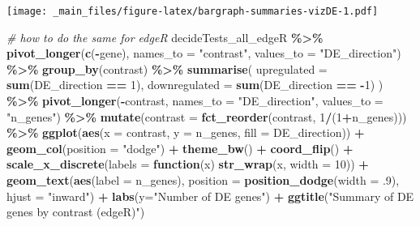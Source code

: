 \documentclass[
]{book}
\newenvironment{Shaded}{\begin{snugshade}}{\end{snugshade}}
\newcommand{\AttributeTok}[1]{\textcolor[rgb]{0.13,0.29,0.53}{#1}}
\newcommand{\CommentTok}[1]{\textcolor[rgb]{0.56,0.35,0.01}{\textit{#1}}}
\newcommand{\ControlFlowTok}[1]{\textcolor[rgb]{0.13,0.29,0.53}{\textbf{#1}}}
\newcommand{\DecValTok}[1]{\textcolor[rgb]{0.00,0.00,0.81}{#1}}
\newcommand{\FunctionTok}[1]{\textcolor[rgb]{0.13,0.29,0.53}{\textbf{#1}}}
\newcommand{\NormalTok}[1]{#1}
\newcommand{\SpecialCharTok}[1]{\textcolor[rgb]{0.81,0.36,0.00}{\textbf{#1}}}
\newcommand{\StringTok}[1]{\textcolor[rgb]{0.31,0.60,0.02}{#1}}
\begin{document}
\texttt{[image: \_main\_files/figure-latex/bargraph-summaries-vizDE-1.pdf]}

\begin{Shaded}
\begin{Highlighting}[]
\CommentTok{\# how to do the same for edgeR}
\NormalTok{decideTests\_all\_edgeR }\SpecialCharTok{\%\textgreater{}\%}
  \FunctionTok{pivot\_longer}\NormalTok{(}\FunctionTok{c}\NormalTok{(}\SpecialCharTok{{-}}\NormalTok{gene), }\AttributeTok{names\_to =} \StringTok{"contrast"}\NormalTok{, }\AttributeTok{values\_to =} \StringTok{"DE\_direction"}\NormalTok{) }\SpecialCharTok{\%\textgreater{}\%}
  \FunctionTok{group\_by}\NormalTok{(contrast) }\SpecialCharTok{\%\textgreater{}\%}
  \FunctionTok{summarise}\NormalTok{(}
    \AttributeTok{upregulated =} \FunctionTok{sum}\NormalTok{(DE\_direction }\SpecialCharTok{==} \DecValTok{1}\NormalTok{),}
    \AttributeTok{downregulated =} \FunctionTok{sum}\NormalTok{(DE\_direction }\SpecialCharTok{==} \SpecialCharTok{{-}}\DecValTok{1}\NormalTok{)}
\NormalTok{  ) }\SpecialCharTok{\%\textgreater{}\%}
  \FunctionTok{pivot\_longer}\NormalTok{(}\SpecialCharTok{{-}}\NormalTok{contrast, }\AttributeTok{names\_to =} \StringTok{"DE\_direction"}\NormalTok{, }\AttributeTok{values\_to =} \StringTok{"n\_genes"}\NormalTok{) }\SpecialCharTok{\%\textgreater{}\%}
  \FunctionTok{mutate}\NormalTok{(}\AttributeTok{contrast =} \FunctionTok{fct\_reorder}\NormalTok{(contrast, }\DecValTok{1}\SpecialCharTok{/}\NormalTok{(}\DecValTok{1}\SpecialCharTok{+}\NormalTok{n\_genes))) }\SpecialCharTok{\%\textgreater{}\%}
  \FunctionTok{ggplot}\NormalTok{(}\FunctionTok{aes}\NormalTok{(}\AttributeTok{x =}\NormalTok{ contrast, }\AttributeTok{y =}\NormalTok{ n\_genes, }\AttributeTok{fill =}\NormalTok{ DE\_direction)) }\SpecialCharTok{+}
  \FunctionTok{geom\_col}\NormalTok{(}\AttributeTok{position =} \StringTok{"dodge"}\NormalTok{) }\SpecialCharTok{+}
  \FunctionTok{theme\_bw}\NormalTok{() }\SpecialCharTok{+}
  \FunctionTok{coord\_flip}\NormalTok{() }\SpecialCharTok{+}
  \FunctionTok{scale\_x\_discrete}\NormalTok{(}\AttributeTok{labels =} \ControlFlowTok{function}\NormalTok{(x) }\FunctionTok{str\_wrap}\NormalTok{(x, }\AttributeTok{width =} \DecValTok{10}\NormalTok{)) }\SpecialCharTok{+}
  \FunctionTok{geom\_text}\NormalTok{(}\FunctionTok{aes}\NormalTok{(}\AttributeTok{label =}\NormalTok{ n\_genes),}
            \AttributeTok{position =} \FunctionTok{position\_dodge}\NormalTok{(}\AttributeTok{width =}\NormalTok{ .}\DecValTok{9}\NormalTok{),}
            \AttributeTok{hjust =} \StringTok{"inward"}\NormalTok{) }\SpecialCharTok{+}
  \FunctionTok{labs}\NormalTok{(}\AttributeTok{y=}\StringTok{"Number of DE genes"}\NormalTok{) }\SpecialCharTok{+}
  \FunctionTok{ggtitle}\NormalTok{(}\StringTok{"Summary of DE genes by contrast (edgeR)"}\NormalTok{)}
\end{Highlighting}
\end{Shaded}
\end{document}
